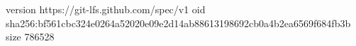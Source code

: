 version https://git-lfs.github.com/spec/v1
oid sha256:bf561cbc324e0264a52020e09e2d14ab88613198692cb0a4b2ea6569f684fb3b
size 786528
